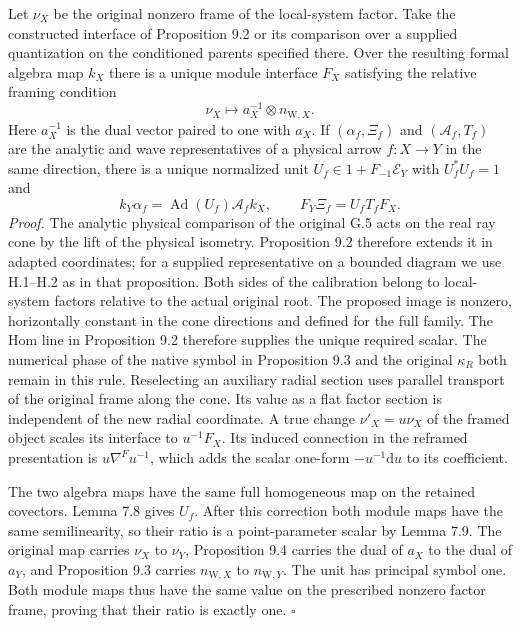 \documentclass[
  english,
  11pt,
  reqno]{amsart}
\begin{document}
Let \(\nu_X\) be the original nonzero frame of the local-system factor.
Take the constructed interface of Proposition 9.2 or its comparison over
a supplied quantization on the conditioned parents specified there. Over
the resulting formal algebra map \(k_X\) there is a unique module
interface \(F_X\) satisfying the relative framing condition%
 \[
\nu_X\longmapsto a_X^{-1}\otimes n_{\mathrm W,X}.
\] Here \(a_X^{-1}\) is the dual vector paired to one with \(a_X\). If
\((\alpha_f,\Xi_f)\) and \((\mathcal A_f,T_f)\) are the analytic and
wave representatives of a physical arrow \(f:X\to Y\) in the same
direction, there is a unique normalized unit
\(U_f\in1+F_{-1}\mathscr E_Y\) with \(U_f^*U_f=1\) and%
 \[
k_Y\alpha_f=\operatorname{Ad}(U_f)\mathcal A_f k_X,\qquad
F_Y\Xi_f=U_f T_f F_X .
\] \emph{Proof.} The analytic physical comparison of the original G.5
acts on the real ray cone by the lift of the physical isometry.
Proposition 9.2 therefore extends it in adapted coordinates; for a
supplied representative on a bounded diagram we use H.1--H.2 as in that
proposition. Both sides of the calibration belong to local-system
factors relative to the actual original root. The proposed image is
nonzero, horizontally constant in the cone directions and defined for
the full family. The Hom line in Proposition 9.2 therefore supplies the
unique required scalar. The numerical phase of the native symbol in
Proposition 9.3 and the original \(\kappa_R\) both remain in this rule.
Reselecting an auxiliary radial section uses parallel transport of the
original frame along the cone. Its value as a flat factor section is
independent of the new radial coordinate. A true change
\(\nu'_X=u\nu_X\) of the framed object scales its interface to
\(u^{-1}F_X\). Its induced connection in the reframed presentation is
\(u\nabla^F u^{-1}\), which adds the scalar one-form
\(-u^{-1}\mathrm du\) to its coefficient.

The two algebra maps have the same full homogeneous map on the retained
covectors. Lemma 7.8 gives \(U_f\). After this correction both module
maps have the same semilinearity, so their ratio is a point-parameter
scalar by Lemma 7.9. The original map carries \(\nu_X\) to \(\nu_Y\),
Proposition 9.4 carries the dual of \(a_X\) to the dual of \(a_Y\), and
Proposition 9.3 carries \(n_{\mathrm W,X}\) to \(n_{\mathrm W,Y}\). The
unit has principal symbol one. Both module maps thus have the same value
on the prescribed nonzero factor frame, proving that their ratio is
exactly one. \hfill\(\square\)
\end{document}
